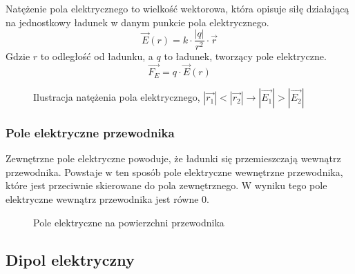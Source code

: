 \documentclass{../notatki}
\begin{document}
Natężenie pola elektrycznego to wielkość wektorowa, która opisuje siłę
działającą na jednostkowy ładunek w danym punkcie pola elektrycznego.
$$
\vec{E}(r) = k \cdot \frac{|q|}{r^2} \cdot \vec{r}
$$
Gdzie $r$ to odległość od ładunku, a $q$ to ładunek, tworzący pole
elektryczne.
$$
\vec{F_E} = q \cdot \vec{E}(r)
$$

\begin{figure*}[h]
  \centering
  \caption{Ilustracja natężenia pola elektrycznego, $|\vec{r_1}| <
  |\vec{r_2}| \rightarrow |\vec{E_1}| > |\vec{E_2}|$}
\end{figure*}

\subsubsection{Pole elektryczne przewodnika}

Zewnętrzne pole elektryczne powoduje, że ładunki się przemieszczają wewnątrz
przewodnika. Powstaje w ten sposób pole elektryczne wewnętrzne
przewodnika, które
jest przeciwnie skierowane do pola zewnętrznego. W wyniku tego pole elektryczne
wewnątrz przewodnika jest równe 0.

\begin{figure}[h]
  \centering
  \caption{Pole elektryczne na powierzchni przewodnika}
\end{figure}

\subsection{Dipol elektryczny}
\end{document}
